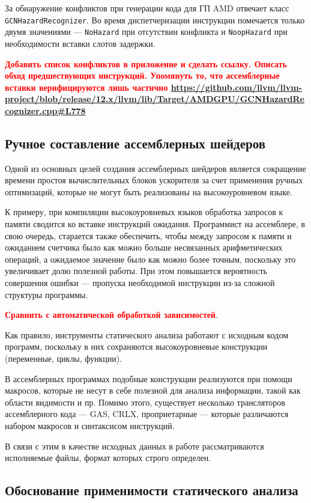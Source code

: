 \documentclass[a4paper,14pt]{extarticle}
\newcommand{\todo}[1]{\textbf{\textcolor{red}{#1}}}
\begin{document}
{За обнаружение конфликтов при генерации кода для ГП AMD отвечает класс \verb|GCNHazardRecognizer|.
Во время диспетчеризации инструкции помечается только двумя значениями — \verb|NoHazard| при
отсутствии конфликта и \verb|NoopHazard| при необходимости вставки слотов задержки.

\todo{Добавить список конфликтов в приложение и сделать ссылку. Описать обход предшествующих инструкций.
Упомянуть то, что ассемблерные вставки верифицируются лишь частично \url{https://github.com/llvm/llvm-project/blob/release/12.x/llvm/lib/Target/AMDGPU/GCNHazardRecognizer.cpp\#L778}}

\subsection{Ручное составление ассемблерных шейдеров}

Одной из основных целей создания ассемблерных шейдеров является сокращение
времени простоя вычислительных блоков ускорителя за счет применения ручных оптимизаций,
которые не могут быть реализованы на высокоуровневом языке.

К примеру, при компиляции высокоуровневых языков обработка запросов к памяти сводится ко вставке
инструкций ожидания. Программист на ассемблере, в свою очередь, старается также обеспечить,
чтобы между запросом к памяти и ожиданием счетчика было как можно больше несвязанных
арифметических операций, а ожидаемое значение было как можно более точным, поскольку
это увеличивает долю полезной работы. При этом повышается вероятность совершения
ошибки — пропуска необходимой инструкции из-за сложной структуры программы.

\todo{Сравнить с автоматической обработкой зависимостей}.

Как правило, инструменты статического анализа работают с исходным кодом программ,
поскольку в них сохраняются высокоуровневые конструкции (переменные, циклы, функции).

В ассемблерных программах подобные конструкции реализуются при помощи макросов,
которые не несут в себе полезной для анализа информации, такой как области видимости и пр.
Помимо этого, существует несколько трансляторов ассемблерного кода — GAS, CRLX, проприетарные — которые
различаются набором макросов и синтаксисом инструкций.

В связи с этим в качестве исходных данных в работе рассматриваются исполняемые файлы,
формат которых строго определен.

\subsection{Обоснование применимости статического анализа}

}
\end{document}
